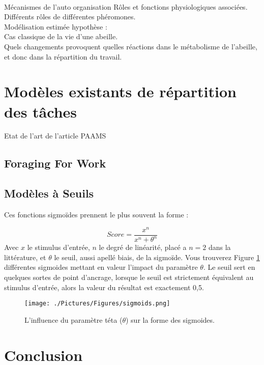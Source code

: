 		\paragraph{}
		Mécanismes de l'auto organisation
			Rôles et fonctions physiologiques associées.\\
			Différents rôles de différentes phéromones.\\
			Modélisation estimée hypothèse : \\
			Cas classique de la vie d'une abeille.\\
			Quels changements provoquent quelles réactions dans le métabolisme de l'abeille, et donc dans la répartition du travail.
	\section{Modèles existants de répartition des tâches}
	Etat de l'art de l'article PAAMS
		\subsection{Foraging For Work}
		\subsection{Modèles à Seuils}
		\label{subsectionRTM}
		
		
		Ces fonctions sigmoïdes prennent le plus souvent la forme :
			
\begin{equation}
	Score = \frac{x^n}{x^n + \theta^n}
\end{equation}	
Avec $x$ le stimulus d'entrée, $n$ le degré de linéarité, placé a $n=2$ dans la littérature, et $\theta$ le seuil, aussi apellé biais, de la sigmoïde. Vous trouverez Figure \ref{sigmoids} différentes sigmoides mettant en valeur l'impact du paramètre $\theta$. Le seuil sert en quelques sortes de point d'ancrage, lorsque le seuil est strictement équivalent au stimulus d'entrée, alors la valeur du résultat est exactement 0,5.
		
		\begin{figure}
		\centering
		\texttt{[image: ./Pictures/Figures/sigmoids.png]}
		\caption{L'influence du paramètre téta ($\theta$) sur la forme des sigmoides.}
		\label{sigmoids}
		\end{figure}
			
	\section*{Conclusion}
